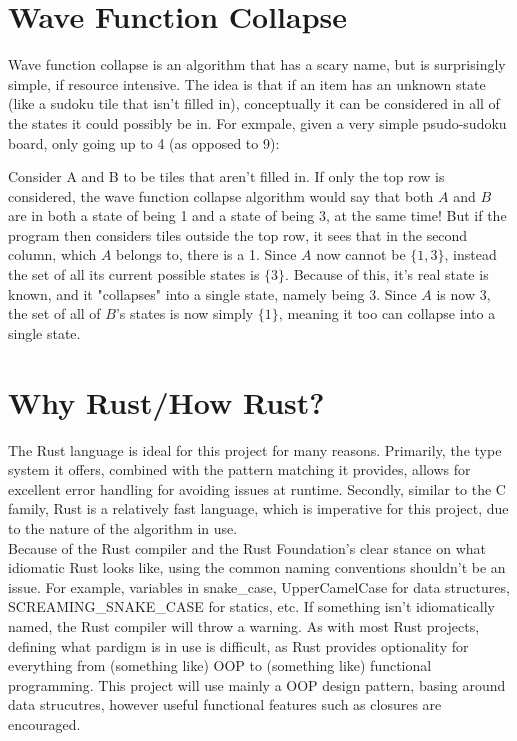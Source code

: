 \documentclass[11pt]{article}
\begin{document}
\section{Wave Function Collapse}
Wave function collapse is an algorithm that has a scary name, but 
is surprisingly simple, if resource intensive. The idea is that if 
an item has an unknown state (like a sudoku tile that isn't filled in), 
conceptually it can be considered in all of the states it could possibly be in.
For exmpale, given a very simple psudo-sudoku board, only going up to 4 (as opposed to 9):\\
\begin{center}
\end{center}
Consider A and B to be tiles that aren't filled in. If only the top row is considered, the wave
function collapse algorithm would say that both $A$ and $B$ are in both a state of being 1 
and a state of being 3, at the same time! But if the program then considers tiles outside the top row,
it sees that in the second column, which $A$ belongs to, there is a 1. Since $A$ now cannot be $\{1, 3\}$, 
instead the set of all its current possible states is $\{3\}$. Because of this, it's real state is known, and it 
"collapses" into a single state, namely being 3. Since $A$ is now 3, the set of all of $B$'s states is now simply
$\{1\}$, meaning it too can collapse into a single state. \\
\section{Why Rust/How Rust?}
The Rust language is ideal for this project for many reasons. Primarily, the type system it offers, combined with the
pattern matching it provides, allows for excellent error handling for avoiding issues at runtime. Secondly, similar to the C family,
Rust is a relatively fast language, which is imperative for this project, due to the nature of the algorithm in use. \\
Because of the Rust compiler and the Rust Foundation's clear stance on what idiomatic Rust looks like, using the common naming conventions shouldn't be an issue.
For example, variables in snake\_case, UpperCamelCase for data structures, SCREAMING\_SNAKE\_CASE for statics, etc. If something isn't idiomatically named, the 
Rust compiler will throw a warning. As with most Rust projects, defining what pardigm is in use is difficult, as Rust provides optionality for everything 
from (something like) OOP to (something like) functional programming. This project will use mainly a OOP design pattern, basing around data 
strucutres, however useful functional features such as closures are encouraged.
\end{document}
